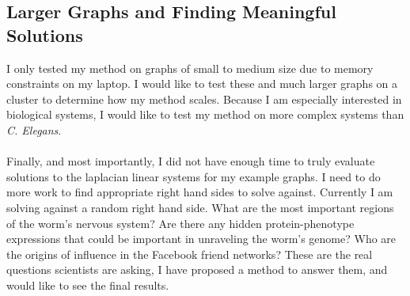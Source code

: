 \documentclass{article}
\begin{document}
\subsection{Larger Graphs and Finding Meaningful Solutions}
I only tested my method on graphs of small to medium size due to memory constraints on my laptop. I would like to test these and much larger graphs on a cluster to determine how my method scales. Because I am especially interested in biological systems, I would like to test my method on more complex systems than \textit{C. Elegans}.\\
 \\
Finally, and most importantly, I did not have enough time to truly evaluate solutions to the laplacian linear systems for my example graphs. I need to do more work to find appropriate right hand sides to solve against. Currently I am solving against a random right hand side. What are the most important regions of the worm's nervous system? Are there any hidden protein-phenotype expressions that could be important in unraveling the worm's genome? Who are the origins of influence in the Facebook friend networks? These are the real questions scientists are asking, I have proposed a method to answer them, and would like to see the final results.
%
%
\end{document}
